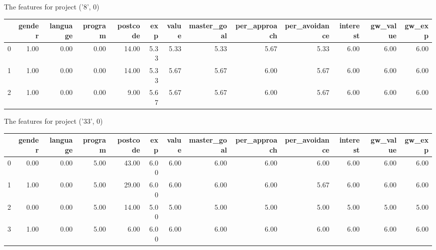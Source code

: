 \documentclass[7pt]{article}
\begin{document}
\begin{landscape}
The features for project ('8', 0)\newline
\begin{tabular}{lrrrrrrrrrrrr}
\toprule
{} &  gender &  language &  program &  postcode &  exp &  value &  master\_goal &  per\_approach &  per\_avoidance &  interest &  gw\_value &  gw\_exp \\
\midrule
0 &    1.00 &      0.00 &     0.00 &     14.00 & 5.33 &   5.33 &         5.33 &          5.67 &           5.33 &      6.00 &             6.00 &           6.00 \\
1 &    1.00 &      0.00 &     0.00 &     14.00 & 5.33 &   5.67 &         5.67 &          6.00 &           5.67 &      6.00 &             6.00 &           6.00 \\
2 &    1.00 &      0.00 &     0.00 &      9.00 & 5.67 &   5.67 &         5.67 &          6.00 &           5.67 &      6.00 &             6.00 &           6.00 \\
\bottomrule
\end{tabular}

The features for project ('33', 0)\newline
\begin{tabular}{lrrrrrrrrrrrr}
\toprule
{} &  gender &  language &  program &  postcode &  exp &  value &  master\_goal &  per\_approach &  per\_avoidance &  interest &  gw\_value &  gw\_exp \\
\midrule
0 &    0.00 &      0.00 &     5.00 &     43.00 & 6.00 &   6.00 &         6.00 &          6.00 &           6.00 &      6.00 &             6.00 &           6.00 \\
1 &    1.00 &      0.00 &     5.00 &     29.00 & 6.00 &   6.00 &         6.00 &          6.00 &           5.67 &      6.00 &             6.00 &           6.00 \\
2 &    0.00 &      0.00 &     5.00 &     14.00 & 5.00 &   5.00 &         5.00 &          5.00 &           5.00 &      5.00 &             5.00 &           5.00 \\
3 &    1.00 &      0.00 &     5.00 &      6.00 & 6.00 &   6.00 &         6.00 &          6.00 &           6.00 &      6.00 &             6.00 &           6.00 \\
\bottomrule
\end{tabular}


\end{landscape}
\end{document}

